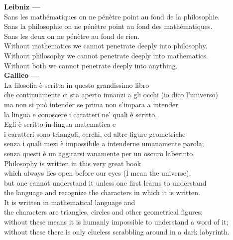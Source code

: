 \documentclass[12pt]{book}
\begin{document}
\textbf{\large Leibniz ---}
\vspace{\baselineskip}
\\
Sans les math\'ematiques on ne p\'en\`etre point au fond de la philosophie.
\\
Sans la philosophie on ne p\'en\`etre point au fond des math\'ematiques.
\\
Sans les deux on ne p\'en\`etre au fond de rien. 
\vspace{.5\baselineskip}
\\
Without mathematics we cannot penetrate deeply into philosophy.
\\
Without philosophy we cannot penetrate deeply into mathematics.
\\
Without both we cannot penetrate deeply into anything.
\vspace{\baselineskip}
\\
\textbf{\large Galileo ---}
\vspace{\baselineskip}
\\
La filosofia \`e scritta in questo grandissimo libro 
\\
che continuamente ci sta aperto innanzi a gli occhi (io dico l'universo) 
\\
ma non si pu\`o intender se prima non s'impara a intender 
\\
la lingua e conoscere i caratteri ne' quali \`e scritto. 
\\
Egli \`e scritto in lingua matematica e 
\\
i caratteri sono triangoli, cerchi, ed altre figure geometriche 
\\
senza i quali mezi \`e impossibile a intenderne umanamente parola; 
\\
senza questi \`e un aggirarsi vanamente per un oscuro laberinto.
\vspace{.5\baselineskip}
\\
Philosophy is written in this very great book  
\\
which always lies open before our eyes (I mean the universe), 
\\
but one cannot understand it unless one first learns to understand 
\\
the language and recognize the characters in which it is written. 
\\
It is written in mathematical language and 
\\
the characters are triangles, circles and other geometrical figures;
\\
without these means it is humanly impossible to understand a word of it; 
\\
without these there is only clueless scrabbling around in a dark labyrinth.
\end{document}
